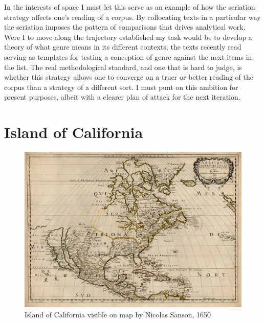 \documentclass[]{book}
\theoremstyle{definition}
\theoremstyle{definition}
\theoremstyle{definition}
\theoremstyle{remark}
\begin{document}
In the interests of space I must let this serve as an example of how the
seriation strategy affects one's reading of a corpus. By collocating
texts in a particular way the seriation imposes the pattern of
comparisons that drives analytical work. Were I to move along the
trajectory established my task would be to develop a theory of what
genre means in its different contexts, the texts recently read serving
as templates for testing a conception of genre against the next items in
the list. The real methodological standard, and one that is hard to
judge, is whether this strategy allows one to converge on a truer or
better reading of the corpus than a strategy of a different sort. I must
punt on this ambition for present purposes, albeit with a clearer plan
of attack for the next iteration.

\hypertarget{island-of-california}{%
\section{Island of California}\label{island-of-california}}

\begin{figure}

{\centering \includegraphics[width=0.9\linewidth]{img/Insel_Kalifornien_1650} 

}

\caption{Island of California visible on map by Nicolas Sanson, 1650}\label{fig:ioc1650}
\end{figure}
\end{document}
